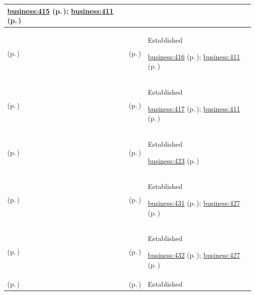 \begin{longtable}{|>{\raggedright\arraybackslash}p{0.27\TableWidth}|>{\raggedright\arraybackslash}p{0.27\TableWidth}|>{\raggedright\arraybackslash}p{0.46\TableWidth}|}
 \hyperref[rad:business:413]{business:415} (p.\,\pageref{rad:business:413}); \hyperref[rad:business:411]{business:411} (p.\,\pageref{rad:business:411})\\\hline
\nameref{cap:bc-care-coordination-transition} (p.\,\pageref{cap:bc-care-coordination-transition}) & \nameref{cap:bc-care-responsibility-transition} (p.\,\pageref{cap:bc-care-responsibility-transition}) & Established

 \hyperref[rad:business:413]{business:416} (p.\,\pageref{rad:business:413}); \hyperref[rad:business:411]{business:411} (p.\,\pageref{rad:business:411})\\\hline
\nameref{cap:bc-care-coordination-transition} (p.\,\pageref{cap:bc-care-coordination-transition}) & \nameref{cap:bc-care-discharge-coordination} (p.\,\pageref{cap:bc-care-discharge-coordination}) & Established

 \hyperref[rad:business:413]{business:417} (p.\,\pageref{rad:business:413}); \hyperref[rad:business:411]{business:411} (p.\,\pageref{rad:business:411})\\\hline
\nameref{cap:bc-care-access-coordination} (p.\,\pageref{cap:bc-care-access-coordination}) & \nameref{cap:bc-care-support-logistics-management} (p.\,\pageref{cap:bc-care-support-logistics-management}) & Established

 \hyperref[rad:business:423]{business:423} (p.\,\pageref{rad:business:423})\\\hline
\nameref{cap:bc-care-support-logistics-management} (p.\,\pageref{cap:bc-care-support-logistics-management}) & \nameref{cap:bc-patient-movement-coordination} (p.\,\pageref{cap:bc-patient-movement-coordination}) & Established

 \hyperref[rad:business:429]{business:431} (p.\,\pageref{rad:business:429}); \hyperref[rad:business:427]{business:427} (p.\,\pageref{rad:business:427})\\\hline
\nameref{cap:bc-care-support-logistics-management} (p.\,\pageref{cap:bc-care-support-logistics-management}) & \nameref{cap:bc-clinical-material-logistics-coordination} (p.\,\pageref{cap:bc-clinical-material-logistics-coordination}) & Established

 \hyperref[rad:business:429]{business:432} (p.\,\pageref{rad:business:429}); \hyperref[rad:business:427]{business:427} (p.\,\pageref{rad:business:427})\\\hline
\nameref{cap:bc-care-support-logistics-management} (p.\,\pageref{cap:bc-care-support-logistics-management}) & \nameref{cap:bc-care-support-work-coordination} (p.\,\pageref{cap:bc-care-support-work-coordination}) & Established


\end{longtable}
